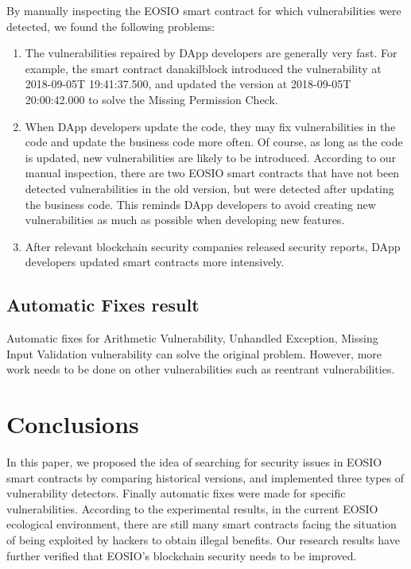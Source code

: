\documentclass[a4paper, 10pt, conference, twocolumn]{ieeeconf}       %
\begin{document}
By manually inspecting the EOSIO smart contract for which vulnerabilities were detected,
we found the following problems:
\begin{enumerate}
    \item The vulnerabilities repaired by DApp developers are generally very fast. For example, the smart contract danakilblock introduced the vulnerability at 2018-09-05T 19:41:37.500, and updated the version at 2018-09-05T 20:00:42.000 to solve the Missing Permission Check.
    \item When DApp developers update the code, they may fix vulnerabilities in the code and update the business code more often. Of course, as long as the code is updated, new vulnerabilities are likely to be introduced. According to our manual inspection, there are two EOSIO smart contracts that have not been detected vulnerabilities in the old version, but were detected after updating the business code. This reminds DApp developers to avoid creating new vulnerabilities as much as possible when developing new features.
    \item After relevant blockchain security companies released security reports, DApp developers updated smart contracts more intensively.
\end{enumerate}

\subsection{Automatic Fixes result}

Automatic fixes for Arithmetic Vulnerability, Unhandled Exception, Missing Input Validation vulnerability can solve the original problem.
However, more work needs to be done on other vulnerabilities such as reentrant vulnerabilities.

\section{Conclusions}

In this paper,
we proposed the idea of searching for security issues in EOSIO smart contracts by comparing historical versions,
and implemented three types of vulnerability detectors.
Finally automatic fixes were made for specific vulnerabilities.
According to the experimental results,
in the current EOSIO ecological environment,
there are still many smart contracts facing the situation of being exploited by hackers to obtain illegal benefits.
Our research results have further verified that EOSIO's blockchain security needs to be improved.
\end{document}

